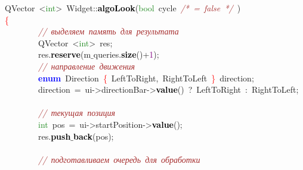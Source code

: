 \noindent
\mbox{}QVector\ \textcolor{BrickRed}{\textless{}}\textcolor{ForestGreen}{int}\textcolor{BrickRed}{\textgreater{}}\ Widget\textcolor{BrickRed}{::}\textbf{\textcolor{Black}{algoLook}}\textcolor{BrickRed}{(}\textcolor{ForestGreen}{bool}\ cycle\ \textit{\textcolor{Brown}{/*\ =\ false\ */}}\ \textcolor{BrickRed}{)} \\
\mbox{}\textcolor{Red}{\{} \\
\mbox{}\ \ \ \ \ \ \ \ \textit{\textcolor{Brown}{//\ выделяем\ память\ для\ результата}} \\
\mbox{}\ \ \ \ \ \ \ \ QVector\ \textcolor{BrickRed}{\textless{}}\textcolor{ForestGreen}{int}\textcolor{BrickRed}{\textgreater{}}\ res\textcolor{BrickRed}{;} \\
\mbox{}\ \ \ \ \ \ \ \ res\textcolor{BrickRed}{.}\textbf{\textcolor{Black}{reserve}}\textcolor{BrickRed}{(}m$\_$queries\textcolor{BrickRed}{.}\textbf{\textcolor{Black}{size}}\textcolor{BrickRed}{()+}\textcolor{Purple}{1}\textcolor{BrickRed}{);} \\
\mbox{}\ \ \ \ \ \ \ \ \textit{\textcolor{Brown}{//\ направление\ движения}} \\
\mbox{}\ \ \ \ \ \ \ \ \textbf{\textcolor{Blue}{enum}}\ Direction\ \textcolor{Red}{\{}\ LeftToRight\textcolor{BrickRed}{,}\ RightToLeft\ \textcolor{Red}{\}}\ direction\textcolor{BrickRed}{;} \\
\mbox{}\ \ \ \ \ \ \ \ direction\ \textcolor{BrickRed}{=}\ ui\textcolor{BrickRed}{-\textgreater{}}directionBar\textcolor{BrickRed}{-\textgreater{}}\textbf{\textcolor{Black}{value}}\textcolor{BrickRed}{()}\ \textcolor{BrickRed}{?}\ LeftToRight\ \textcolor{BrickRed}{:}\ RightToLeft\textcolor{BrickRed}{;} \\
\mbox{} \\
\mbox{}\ \ \ \ \ \ \ \ \textit{\textcolor{Brown}{//\ текущая\ позиция}} \\
\mbox{}\ \ \ \ \ \ \ \ \textcolor{ForestGreen}{int}\ pos\ \textcolor{BrickRed}{=}\ ui\textcolor{BrickRed}{-\textgreater{}}startPosition\textcolor{BrickRed}{-\textgreater{}}\textbf{\textcolor{Black}{value}}\textcolor{BrickRed}{();} \\
\mbox{}\ \ \ \ \ \ \ \ res\textcolor{BrickRed}{.}\textbf{\textcolor{Black}{push$\_$back}}\textcolor{BrickRed}{(}pos\textcolor{BrickRed}{);} \\
\mbox{} \\
\mbox{}\ \ \ \ \ \ \ \ \textit{\textcolor{Brown}{//\ подготавливаем\ очередь\ для\ обработки}} \\
